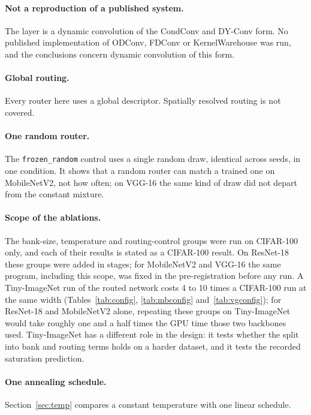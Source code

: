 \documentclass[10pt,a4paper]{article}
\begin{document}
\paragraph{Not a reproduction of a published system.} The layer is a
dynamic convolution of the CondConv and DY-Conv form. No published
implementation of ODConv, FDConv or KernelWarehouse was run, and the
conclusions concern dynamic convolution of this form.

\paragraph{Global routing.} Every router here uses a global descriptor.
Spatially resolved routing is not covered.

\paragraph{One random router.} The \texttt{frozen\_random} control uses a
single random draw, identical across seeds, in one condition. It shows that
a random router can match a trained one on MobileNetV2, not how often; on
VGG-16 the same kind of draw did not depart from the constant mixture.

\paragraph{Scope of the ablations.} The bank-size, temperature and
routing-control groups were run on CIFAR-100 only, and each of their
results is stated as a CIFAR-100 result. On ResNet-18 these groups were
added in stages; for MobileNetV2 and VGG-16 the same program, including
this scope, was fixed in the pre-registration before any run. A
Tiny-ImageNet run of the routed network costs 4 to 10 times a CIFAR-100
run at the same width (Tables~\ref{tab:config}, \ref{tab:mbconfig}
and~\ref{tab:vgconfig}); for ResNet-18 and MobileNetV2 alone, repeating
these groups on Tiny-ImageNet would take roughly one and a half times the
GPU time those two backbones used. Tiny-ImageNet has a different role in
the design: it tests whether the split into bank and routing terms holds
on a harder dataset, and it tests the recorded saturation prediction.

\paragraph{One annealing schedule.} Section~\ref{sec:temp} compares a
constant temperature with one linear schedule.
\end{document}
